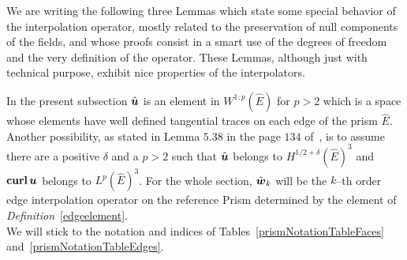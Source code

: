 We are writing the following three Lemmas which state some special
behavior of the interpolation operator, mostly related to the preservation of
null components of the fields, and whose proofs consist in a smart use of the
degrees of freedom and the very definition of the operator. These Lemmas, 
although just with technical purpose, exhibit
nice properties of the interpolators.

In the present subsection $\hat{\boldsymbol{u}}$ is an element
in $W^{1,p}(\hat{E})$ for $p>2$ which is a space whose elements have well
defined tangential traces on each edge of the prism $\hat{E}$.
Another possibility, as stated in Lemma $5.38$ in the page $134$ of~\cite{monk},
is to assume there are 
a positive $\delta$ and a $p>2$ such that 
$\hat{\boldsymbol{u}}$ belongs to $H^{1/2+\delta}(\hat{E})^3$ and
${\bf curl}\,\boldsymbol{u}$ belongs to $L^p(\hat{E})^3$.
For the whole section, $\hat{\boldsymbol{w}}_k$ will be the $k$--th order edge 
interpolation operator on the reference
Prism determined by the element of
\emph{Definition}~\ref{edgeelement}.
\\

We will stick to the notation and indices of Tables~\ref{prismNotationTableFaces}
and~\ref{prismNotationTableEdges}.

